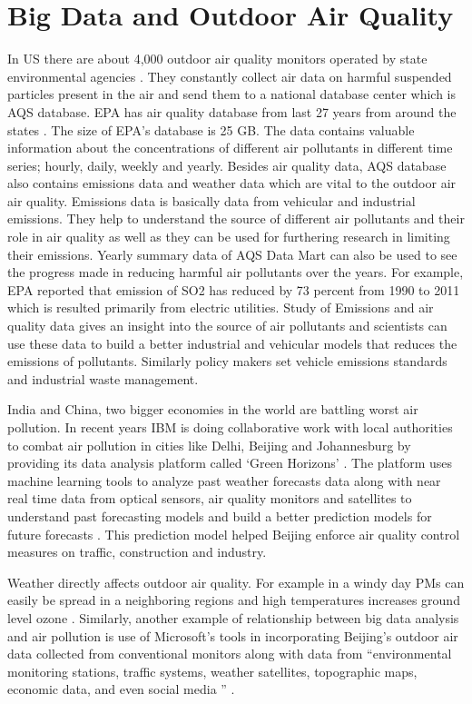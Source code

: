\documentclass[sigconf]{acmart}
\begin{document}
\section{Big Data and Outdoor Air Quality}
In US there are about 4,000 outdoor air quality monitors operated by state environmental agencies \cite{outdoor-air}. They constantly collect air data on harmful suspended particles present in the air and send them to a national database center which is
   AQS database. EPA has air quality database from last 27 years from around the states \cite{googlecloud}. The size of EPA's database is 25 GB. The data contains valuable information about the concentrations of different air pollutants in different time series; hourly, daily, weekly and yearly. Besides air quality data, AQS database also contains emissions data and weather data which are vital to the outdoor air air quality. Emissions data is basically data from vehicular and industrial emissions. They help to  understand the source of different air pollutants and their role in air quality as well as they can be used for furthering research in limiting their emissions. Yearly summary data of AQS Data Mart can also be used to see the progress made in reducing harmful air pollutants over the years. For example, EPA reported that emission of SO2 has reduced by 73 percent from 1990 to 2011 which is resulted primarily from electric utilities. Study of Emissions and air quality data gives an insight into the source of air pollutants and scientists can use these data to build a better industrial and vehicular models that reduces the emissions of pollutants. Similarly policy makers set vehicle emissions standards and industrial waste management. 

India and China, two bigger economies in the world are battling worst air pollution. In recent years IBM is doing collaborative work with local authorities to combat air pollution in cities like Delhi, Beijing and Johannesburg by providing its data analysis platform called `Green Horizons' \cite{www-huffingtonpost-com}. The platform uses machine learning tools to analyze past weather forecasts data along with near real time data from optical sensors, air quality monitors and satellites to understand past forecasting models and build a better prediction models for future forecasts \cite{www-huffingtonpost-com}. This prediction model helped Beijing enforce air quality control measures on traffic, construction and industry. 

Weather directly affects outdoor air quality. For example in a windy day PMs can easily be spread in a neighboring regions and high temperatures increases ground level ozone \cite{www-huffingtonpost-com}. Similarly, another example of relationship between big data analysis and air pollution is use of Microsoft's tools in incorporating Beijing's outdoor air data collected from conventional monitors along with data from ``environmental monitoring stations, traffic systems, weather satellites, topographic maps, economic data, and even social media '' \cite{spectrum-ieee}. 
\end{document}
